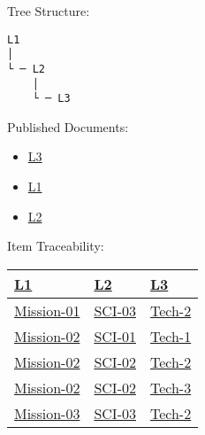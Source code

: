 \begin{frame}[fragile]{Tree Structure:}

\begin{verbatim}
L1
│   
└ ─ L2
    │   
    └ ─ L3
\end{verbatim}

\end{frame}

\begin{frame}{Published Documents:}

\begin{itemize}
\tightlist
\item
  \href{L3.html}{L3}
\item
  \href{L1.html}{L1}
\item
  \href{L2.html}{L2}
\end{itemize}

\end{frame}

\begin{frame}{Item Traceability:}

\begin{longtable}[c]{@{}lll@{}}
\toprule
\href{L1.html}{L1} & \href{L2.html}{L2} &
\href{L3.html}{L3}\tabularnewline
\midrule
\endhead
\href{L1.html\#Mission-01}{Mission-01} & \href{L2.html\#SCI-03}{SCI-03}
& \href{L3.html\#Tech-2}{Tech-2}\tabularnewline
\href{L1.html\#Mission-02}{Mission-02} & \href{L2.html\#SCI-01}{SCI-01}
& \href{L3.html\#Tech-1}{Tech-1}\tabularnewline
\href{L1.html\#Mission-02}{Mission-02} & \href{L2.html\#SCI-02}{SCI-02}
& \href{L3.html\#Tech-2}{Tech-2}\tabularnewline
\href{L1.html\#Mission-02}{Mission-02} & \href{L2.html\#SCI-02}{SCI-02}
& \href{L3.html\#Tech-3}{Tech-3}\tabularnewline
\href{L1.html\#Mission-03}{Mission-03} & \href{L2.html\#SCI-03}{SCI-03}
& \href{L3.html\#Tech-2}{Tech-2}\tabularnewline
\bottomrule
\end{longtable}

\end{frame}
